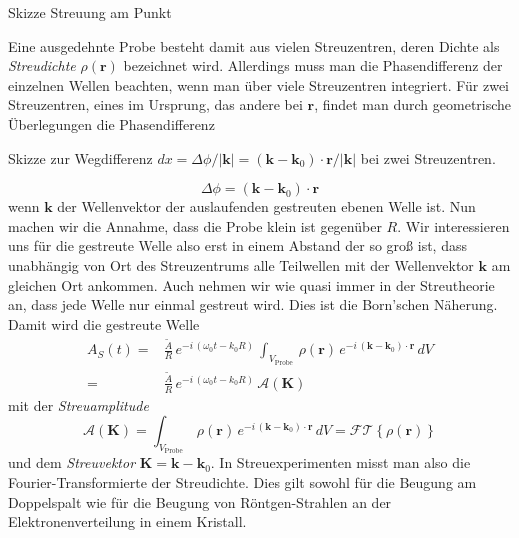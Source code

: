 \begin{marginfigure}


\caption{Skizze Streuung am Punkt}
\end{marginfigure}




Eine ausgedehnte Probe besteht damit aus vielen Streuzentren, deren Dichte als \emph{Streudichte} $\rho(\mathbf{r})$ bezeichnet wird. Allerdings muss man die Phasendifferenz der einzelnen Wellen beachten, wenn man über viele Streuzentren integriert. Für zwei Streuzentren, eines im Ursprung, das andere bei $\mathbf{r}$, findet man durch geometrische Überlegungen die Phasendifferenz
%
\begin{marginfigure}

\caption{Skizze zur  Wegdifferenz $dx =  \Delta \phi / | \mathbf{k}|=  ( \mathbf{k} - \mathbf{k}_0 ) \cdot \mathbf{r} / |\mathbf{k}| $ bei zwei Streuzentren.}
\end{marginfigure}
%
\begin{equation}
\Delta \phi = ( \mathbf{k} - \mathbf{k}_0 ) \cdot \mathbf{r}
\end{equation}
wenn $\mathbf{k}$ der Wellenvektor der auslaufenden gestreuten ebenen Welle ist. Nun machen wir die Annahme, dass die Probe klein ist gegenüber $R$. Wir interessieren uns für die gestreute Welle also erst in einem Abstand der so groß ist, dass unabhängig von Ort des Streuzentrums alle Teilwellen mit der Wellenvektor $\mathbf{k}$ am gleichen Ort ankommen. Auch nehmen wir wie quasi immer in der Streutheorie an, dass jede Welle nur einmal gestreut wird. Dies ist die  Born'schen Näherung. Damit wird die gestreute Welle
\begin{align}
 A_S(t) = & \frac{\tilde{A}}{R} \,   e^{- i \, (\omega_0 t - k_0 R)} \,
  \int_{V_\text{Probe}} \, \rho( \mathbf{r}) \,   e^{- i \,  ( \mathbf{k} - \mathbf{k}_0 ) \cdot \mathbf{r}} \, dV \\
  = & \frac{\tilde{A}}{R} \,   e^{- i \, (\omega_0 t - k_0 R)} \, \mathcal{A}(\mathbf{K})
\end{align}
mit der \emph{Streuamplitude} 
\begin{equation}
\mathcal{A}(\mathbf{K}) =  \int_{V_\text{Probe}} \, \rho( \mathbf{r}) \,   e^{- i \,  ( \mathbf{k} - \mathbf{k}_0 ) \cdot \mathbf{r}} \, dV  = \mathcal{FT} \left\{ \rho( \mathbf{r})  \right\} \label{eq:rezi_streuamplitude}
\end{equation}
und dem \emph{Streuvektor} $\mathbf{K} = \mathbf{k} - \mathbf{k}_0$. In Streuexperimenten misst man also die Fourier-Transformierte der Streudichte. Dies gilt sowohl für die Beugung am Doppelspalt wie für die Beugung von Röntgen-Strahlen an der Elektronenverteilung in einem Kristall. 

